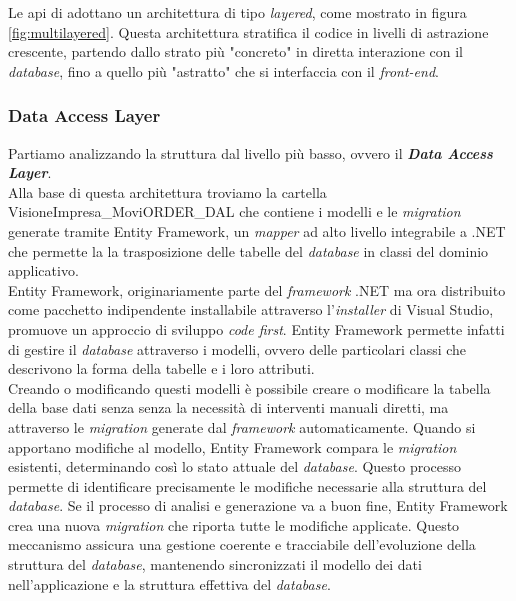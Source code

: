 Le \gls{api} di {\movi} adottano un architettura di tipo \textit{layered}, come mostrato in 
figura \ref{fig:multilayered}. Questa architettura stratifica il codice in livelli di astrazione crescente, 
partendo dallo strato più "concreto" in diretta interazione con il \textit{database}, fino a quello più 
"astratto" che si interfaccia con il \textit{front-end}.
\subsubsection{Data Access Layer}
Partiamo analizzando la struttura dal livello più basso, ovvero il \textbf{\textit{Data Access Layer}}.\\
Alla base di questa architettura troviamo la cartella VisioneImpresa\_MoviORDER\_DAL che contiene i modelli e le \textit{migration} 
generate tramite Entity Framework, un \textit{mapper} ad alto livello integrabile a .NET che permette la  la trasposizione delle tabelle 
del \textit{database} in classi del dominio applicativo.\\
Entity Framework, originariamente parte del \textit{framework} .NET ma ora distribuito come pacchetto 
indipendente installabile attraverso l'\textit{installer} di Visual Studio, promuove un approccio di sviluppo 
\textit{code first}. Entity Framework permette infatti di gestire il \textit{database} attraverso i modelli, 
ovvero delle particolari classi che descrivono la forma della tabelle e i loro attributi.\\
Creando o modificando questi modelli è possibile creare o modificare la tabella della base dati senza senza la necessità di interventi 
manuali diretti, ma attraverso le \textit{migration} generate dal \textit{framework} automaticamente. 
Quando si apportano modifiche al modello, Entity Framework compara le \textit{migration} esistenti, determinando 
così lo stato attuale del \textit{database}. Questo processo permette di identificare precisamente le modifiche necessarie 
alla struttura del \textit{database}. Se il processo di analisi e generazione va a buon fine, Entity Framework crea una 
nuova \textit{migration} che riporta tutte le modifiche applicate. Questo meccanismo assicura una gestione coerente e 
tracciabile dell'evoluzione della struttura del \textit{database}, mantenendo sincronizzati il modello dei dati 
nell'applicazione e la struttura effettiva del \textit{database}.
